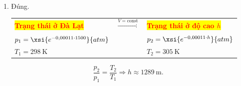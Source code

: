 \begin{enumerate}[label=\bfseries Câu \arabic*:, leftmargin=1.7cm]
{\begin{enumerate}[label=\alph*)]
\begin{center}
\begin{tabular}{C{4cm} C{3cm} C{4cm}}
			$p_1=\SI{0.848}{atm}$ & &$p_2=?$\\
			$T_1=\SI{298}{\kelvin}$ & & $T_2=\SI{305}{\kelvin}$\\
			$V_1=\SI{500}{\liter}$ & & $V_2=?$\\
		\end{tabular}
	\end{center}
Áp dụng phương trình trạng thái khí lí tưởng:
$$\dfrac{p_1V_1}{T_1}=\dfrac{p_2V_2}{T_2}\Rightarrow V_2\approx\SI{434}{\milli\liter}.$$
\item  Đúng.\\
\begin{center}
	\begin{tabular}{C{4cm} C{3cm} C{4cm}}
		\colorbox{yellow}{\textcolor{red}{\textbf{Trạng thái ở Đà Lạt}}} & $\xrightarrow[]{V=\text{const}}$ & \colorbox{yellow}{\textcolor{red}{\textbf{Trạng thái ở độ cao $h$}}}\\
		$p_1=\xsi{e^{-0,00011\cdot1500}}{atm}$ & &$p_2=\xsi{e^{-0,00011\cdot h}}{atm}$\\
		$T_1=\SI{298}{\kelvin}$ & & $T_2=\SI{305}{\kelvin}$
	\end{tabular}
\end{center}

$$\dfrac{p_2}{p_1}=\dfrac{T_2}{T_1}\Rightarrow h\approx\SI{1289}{\meter}.$$
\end{enumerate}
}


\end{enumerate}
